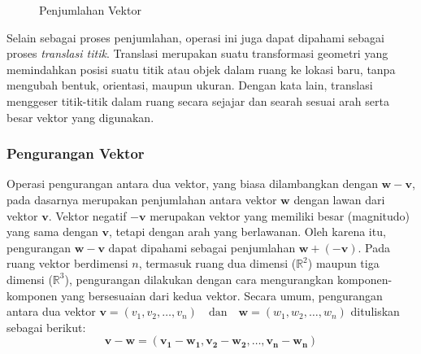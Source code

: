 \documentclass[a4paper,12pt]{report}
\numberwithin{equation}{chapter}
\begin{document}
\begin{figure}[h!]
    \centering
    \caption{Penjumlahan Vektor}
    \label{fig:Penjumlahan Vektor}
\end{figure}

Selain sebagai proses penjumlahan, operasi ini juga dapat dipahami sebagai proses \textit{translasi titik}. Translasi merupakan suatu transformasi geometri yang memindahkan posisi suatu titik atau objek dalam ruang ke lokasi baru, tanpa mengubah bentuk, orientasi, maupun ukuran. Dengan kata lain, translasi menggeser titik-titik dalam ruang secara sejajar dan searah sesuai arah serta besar vektor yang digunakan.

\subsubsection{Pengurangan Vektor}
Operasi pengurangan antara dua vektor, yang biasa dilambangkan dengan  \( \mathbf{w} - \mathbf{v} \), pada dasarnya merupakan penjumlahan antara vektor \(\mathbf{w}\) dengan lawan dari vektor \(\mathbf{v}\). Vektor negatif \(-\mathbf{v}\) merupakan vektor yang memiliki besar (magnitudo) yang sama dengan \(\mathbf{v}\), tetapi dengan arah yang berlawanan. Oleh karena itu, pengurangan \(\mathbf{w} - \mathbf{v}\) dapat dipahami sebagai penjumlahan \(\mathbf{w} + (- \mathbf{v})\). Pada ruang vektor berdimensi \(n\), termasuk ruang dua dimensi ($\mathbb{R}^2$) maupun tiga dimensi ($\mathbb{R}^3$), pengurangan dilakukan dengan cara mengurangkan komponen-komponen yang bersesuaian dari kedua vektor. Secara umum, pengurangan antara dua vektor $\mathbf{v} = (v_1, v_2, \ldots, v_n) \quad \text{dan} \quad \mathbf{w} = (w_1, w_2, \ldots, w_n)$ dituliskan sebagai berikut:
\[
\mathbf{v} - \mathbf{w} = (\mathbf{v_1-w_1, v_2-w_2,\ldots,v_n-w_n})
\]
\end{document}
